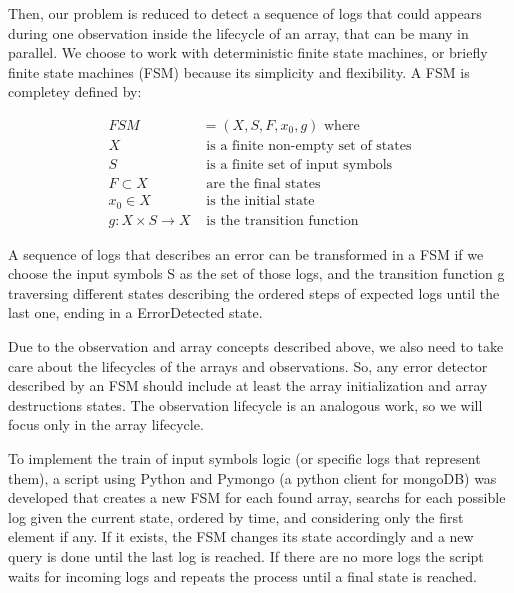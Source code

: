\documentclass[]{spie}  %
\begin{document}
Then, our problem is reduced to detect a sequence of logs that could appears
during one observation inside the lifecycle of an array, that can be many in
parallel. We choose to work with deterministic finite state machines, or
briefly finite state machines (FSM) because its simplicity and flexibility. A
FSM is completey defined by:

\begin{align*}
FSM &= (X,S,F,x_{0},g) \mbox{ where}\\
X & \mbox{ is a finite non-empty set of states}\\
S & \mbox{ is a finite set of input symbols}\\
F \subset X & \mbox{ are the final states}\\
x_{0} \in X & \mbox{ is the initial state}\\
g: X \times S \to X & \mbox{ is the transition function}
\end{align*}

A sequence of logs that describes an error can be transformed in a FSM if we
choose the input symbols S as the set of those logs, and the transition
function g traversing different states describing the ordered steps of expected
logs until the last one, ending in a ErrorDetected state. 

Due to the observation and array concepts described above, we also need to take
care about the lifecycles of the arrays and observations. So, any error
detector described by an FSM should include at least the array initialization
and array destructions states. The observation lifecycle is an analogous work,
    so we will focus only in the array lifecycle.

To implement the train of input symbols logic (or specific logs that represent
        them), a script using Python and Pymongo (a python client for mongoDB)
    was developed that creates a new FSM for each found array, searchs for each
    possible log given the current state, ordered by time, and considering only
    the first element if any. If it exists, the FSM changes its state
    accordingly and a new query is done until the last log is reached. If there
    are no more logs the script waits for incoming logs and repeats the process
    until a final state is reached.
\end{document}
